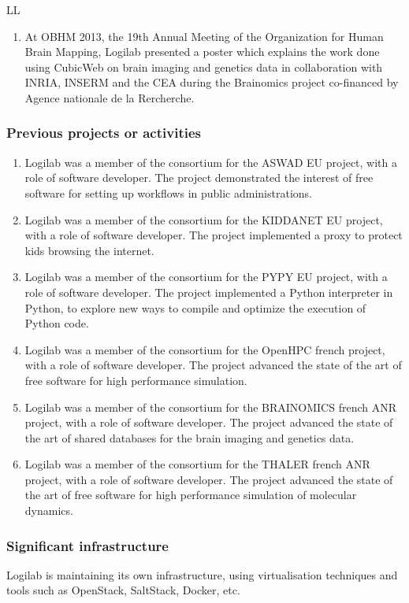 \begin{sitedescription}{LL}
\begin{enumerate}
 \item At OBHM 2013, the 19th Annual Meeting of the Organization for Human Brain
   Mapping, Logilab presented a poster which explains the work done using
   CubicWeb on brain imaging and genetics data in collaboration with INRIA,
   INSERM and the CEA during the Brainomics project co-financed by Agence
   nationale de la Rercherche.

\end{enumerate}

\subsubsection*{Previous projects or activities}

\begin{enumerate}
\item Logilab was a member of the consortium for the ASWAD EU project, with a
  role of software developer. The project demonstrated the interest of free
  software for setting up workflows in public administrations.
\item Logilab was a member of the consortium for the KIDDANET EU project, with a
  role of software developer. The project implemented a proxy to protect kids
  browsing the internet.
\item Logilab was a member of the consortium for the PYPY EU project, with a
  role of software developer. The project implemented a Python interpreter in
  Python, to explore new ways to compile and optimize the execution of Python
  code.
\item Logilab was a member of the consortium for the OpenHPC french project,
  with a role of software developer. The project advanced the state of the art
  of free software for high performance simulation.
\item Logilab was a member of the consortium for the BRAINOMICS french ANR
  project, with a role of software developer. The project advanced the state of
  the art of shared databases for the brain imaging and genetics data.
\item Logilab was a member of the consortium for the THALER french ANR project,
  with a role of software developer. The project advanced the state of the art
  of free software for high performance simulation of molecular dynamics.
\end{enumerate}

\subsubsection*{Significant infrastructure}

Logilab is maintaining its own infrastructure, using virtualisation techniques
and tools such as OpenStack, SaltStack, Docker, etc.

\end{sitedescription}





